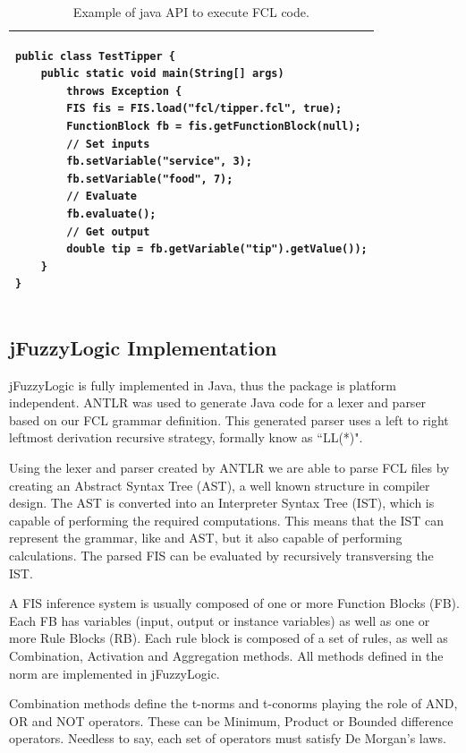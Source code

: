\documentclass[conference]{IEEEtran}
\begin{document}
\begin{table}[!t]
\renewcommand{\arraystretch}{1.3}
\caption{Example of java API to execute FCL code.}
\label{t:javaexample}
\centering
\begin{tabular}{|l|}
\hline
\begin{lstlisting}
public class TestTipper {
	public static void main(String[] args) 
		throws Exception {
		FIS fis = FIS.load("fcl/tipper.fcl", true);
		FunctionBlock fb = fis.getFunctionBlock(null);
		// Set inputs
		fb.setVariable("service", 3); 
		fb.setVariable("food", 7);
		// Evaluate
		fb.evaluate(); 
		// Get output
		double tip = fb.getVariable("tip").getValue());
	}
}
\end{lstlisting} \\
\hline
\end{tabular}
\end{table}

\subsection{jFuzzyLogic Implementation \label{sec:implement}}

jFuzzyLogic is fully implemented in Java, thus the package is platform independent. 
ANTLR\cite{parr2007definitive} was used to generate Java code for a lexer and parser based on our FCL grammar definition. 
This generated parser uses a left to right leftmost derivation recursive strategy, formally know as ``LL(*)".

Using the lexer and parser created by ANTLR we are able to parse FCL files by creating an Abstract Syntax Tree (AST), a well known structure in compiler design. 
The AST is converted into an Interpreter Syntax Tree (IST), which is capable of performing the required computations.
This means that the IST can represent the grammar, like and AST, but it also capable of performing calculations. 
The parsed FIS can be evaluated by recursively transversing the IST.

A FIS inference system is usually composed of one or more Function Blocks (FB). 
Each FB has variables (input, output or instance variables) as well as one or more Rule Blocks (RB). 
Each rule  block is composed of a set of rules, as well as Combination, Activation and Aggregation methods. 
All methods defined in the norm are implemented in jFuzzyLogic.

Combination methods define the t-norms and t-conorms playing the role of AND, OR and NOT operators.
These can be Minimum, Product or Bounded difference operators.
Needless to say, each set of operators must satisfy De Morgan’s laws.
\end{document}
